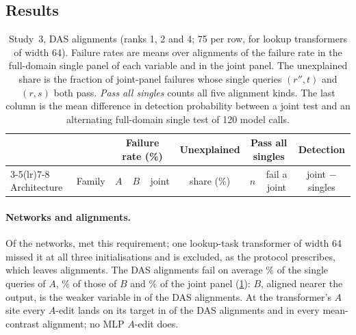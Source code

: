 \subsection{Results}

\begin{table}[t]
\centering
\small
\setlength{\tabcolsep}{4pt}
\begin{tabular}{@{}l l c c c c c c c@{}}
\toprule
& & \multicolumn{3}{c}{Failure rate (\%)} & Unexplained & \multicolumn{2}{c}{Pass all singles} & Detection \\
\cmidrule(lr){3-5}\cmidrule(lr){7-8}
Architecture & Family & $A$ & $B$ & joint & share (\%) & $n$ & fail a joint & joint $-$ singles \\
\midrule

\end{tabular}
\caption{Study~3, DAS alignments (ranks 1, 2 and 4; 75 per row, \MsLookupWideDas{} for lookup transformers of width 64). Failure rates
are means over alignments of the failure rate in the full-domain single panel of each variable and in the joint
panel. The unexplained share is the fraction of joint-panel failures whose single queries $(r'',t)$ and $(r,s)$ both
pass. \emph{Pass all singles} counts all five alignment kinds. The last column is the mean difference in detection
probability between a joint test and an alternating full-domain single test of 120 model calls.}
\label{tab:multisite}
\end{table}

\paragraph{Networks and alignments.}
Of the \MsNetworks{} networks, \MsCompetent{} met this requirement; one lookup-task transformer of width 64 missed it
at all three initialisations and is excluded, as the protocol prescribes, which leaves \MsAlignments{} alignments. The DAS
alignments fail on average \MsRateA\% of the single queries of $A$, \MsRateB\% of those of $B$ and \MsRateJoint\% of
the joint panel (\cref{tab:multisite}): $B$, aligned nearer the output, is the weaker variable in \MsMechBMore{} of the
\MsDas{} DAS alignments. At the transformer's $A$ site every $A$-edit lands on its target in \MsLandTransformer{} of the
\MsDasTransformer{} DAS alignments and in every mean-contrast alignment; no MLP $A$-edit does.

